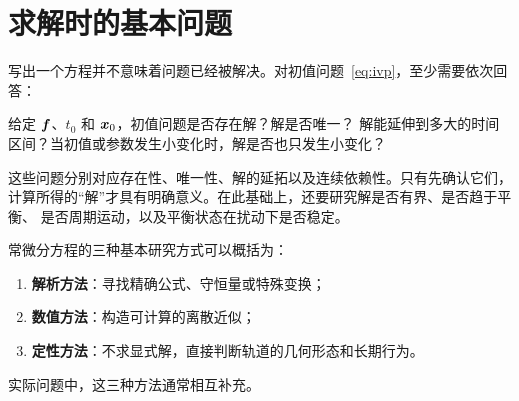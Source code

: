 \section{求解时的基本问题}

写出一个方程并不意味着问题已经被解决。对初值问题~\eqref{eq:ivp}，至少需要依次回答：

\begin{problem}
给定 $\boldsymbol{f}$、$t_0$ 和 $\boldsymbol{x}_0$，初值问题是否存在解？解是否唯一？
解能延伸到多大的时间区间？当初值或参数发生小变化时，解是否也只发生小变化？
\end{problem}

这些问题分别对应存在性、唯一性、解的延拓以及连续依赖性。只有先确认它们，
计算所得的“解”才具有明确意义。在此基础上，还要研究解是否有界、是否趋于平衡、
是否周期运动，以及平衡状态在扰动下是否稳定。


常微分方程的三种基本研究方式可以概括为：
\begin{enumerate}
	\item \textbf{解析方法}：寻找精确公式、守恒量或特殊变换；
	\item \textbf{数值方法}：构造可计算的离散近似；
	\item \textbf{定性方法}：不求显式解，直接判断轨道的几何形态和长期行为。
\end{enumerate}
实际问题中，这三种方法通常相互补充。

